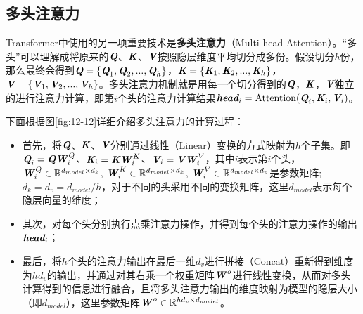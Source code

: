 
\subsection{多头注意力}

\parinterval Transformer中使用的另一项重要技术是{\small\sffamily\bfseries{多头注意力}}（Multi-head Attention）。“多头”可以理解成将原来的$\textbf{\em Q}$、$\textbf{\em K}$、$\textbf{\em V}$按照隐层维度平均切分成多份。假设切分$h$份，那么最终会得到$\textbf{\em Q} = \{ \textbf{\em Q}_1, \textbf{\em Q}_2,...,\textbf{\em Q}_h \}$，$\textbf{\em K}=\{ \textbf{\em K}_1,\textbf{\em K}_2,...,\textbf{\em K}_h \}$，$\textbf{\em V}=\{ \textbf{\em V}_1, \textbf{\em V}_2,...,\textbf{\em V}_h \}$。多头注意力机制就是用每一个切分得到的$\textbf{\em Q}$，$\textbf{\em K}$，$\textbf{\em V}$独立的进行注意力计算，即第$i$个头的注意力计算结果$\textbf{\em head}_i = \textrm{Attention}(\textbf{\em Q}_i,\textbf{\em K}_i, \textbf{\em V}_i)$。

\parinterval 下面根据图\ref{fig:12-12}详细介绍多头注意力的计算过程：

\begin{itemize}
\vspace{0.5em}
\item 首先，将$\textbf{\em Q}$、$\textbf{\em K}$、$\textbf{\em V}$分别通过线性（Linear）变换的方式映射为$h$个子集。即$\textbf{\em Q}_i = \textbf{\em Q}\textbf{\em W}_i^{\,Q} $、$\textbf{\em K}_i = \textbf{\em K}\textbf{\em W}_i^{\,K} $、$\textbf{\em V}_i = \textbf{\em V}\textbf{\em W}_i^{\,V} $，其中$i$表示第$i$个头， $\textbf{\em W}_i^{\,Q}  \in \mathbb{R}^{d_{model} \times d_k}$,  $\textbf{\em W}_i^{\,K}  \in \mathbb{R}^{d_{model} \times d_k}$,  $\textbf{\em W}_i^{\,V}  \in \mathbb{R}^{d_{model} \times d_v}$是参数矩阵; $d_k=d_v=d_{model} / h$，对于不同的头采用不同的变换矩阵，这里$d_{model}$表示每个隐层向量的维度；
\vspace{0.5em}
\item 其次，对每个头分别执行点乘注意力操作，并得到每个头的注意力操作的输出$\textbf{\em head}_i$；
\vspace{0.5em}
\item 最后，将$h$个头的注意力输出在最后一维$d_v$进行拼接（Concat）重新得到维度为$hd_v$的输出，并通过对其右乘一个权重矩阵$\textbf{\em W}^{\,o}$进行线性变换，从而对多头计算得到的信息进行融合，且将多头注意力输出的维度映射为模型的隐层大小（即$d_{model}$），这里参数矩阵$\textbf{\em W}^{\,o} \in \mathbb{R}^{h d_v \times d_{model}}$。
\vspace{0.5em}
\end{itemize}

